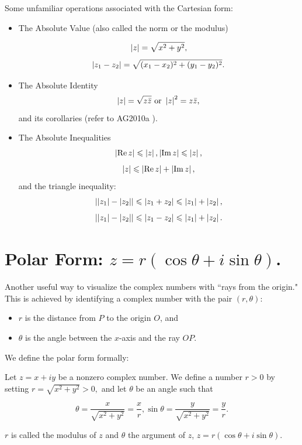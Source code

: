 \documentclass[11pt,reqno,oneside,a4paper]{article}
\begin{document}
Some unfamiliar operations associated with the Cartesian form: 
\begin{itemize}
	\item The Absolute Value (also called the norm or the modulus)
	
	$$\left\lvert z\right\rvert = \sqrt{x^2 + y^2},$$
	$$\left\lvert z_1 - z_2\right\rvert = \sqrt{(x_1-x_2)^2 + (y_1 - y_2)^2}.$$
	
	\item The Absolute Identity
	$$\left\lvert z\right\rvert = \sqrt{z \bar{z}} \text{ or } \left\lvert z\right\rvert^2 = z \bar{z},$$
	and its corollaries (refer to AG2010a \cite{AG2010a}). 
	
	\item The Absolute Inequalities
	$$\left\lvert\operatorname*{Re} z\right\rvert \leqslant \left\lvert z\right\rvert, \left\lvert\operatorname*{Im} z\right\rvert \leqslant \left\lvert z\right\rvert,$$
	$$\left\lvert z\right\rvert \leqslant \left\lvert\operatorname*{Re} z\right\rvert + \left\lvert\operatorname*{Im} z\right\rvert,$$
	and the triangle inequality: 
	$$\left\lvert\left\lvert z_1\right\rvert-\left\lvert z_2\right\rvert\right\rvert \leqslant \left\lvert z_1 + z_2\right\rvert \leqslant \left\lvert z_1\right\rvert + \left\lvert z_2\right\rvert,$$
	$$\left\lvert\left\lvert z_1\right\rvert-\left\lvert z_2\right\rvert\right\rvert \leqslant \left\lvert z_1 - z_2\right\rvert \leqslant \left\lvert z_1\right\rvert + \left\lvert z_2\right\rvert.$$ 
\end{itemize}

\section{Polar Form: $z = r(\cos\theta + i\sin\theta)$.}
Another useful way to visualize the complex numbers with ``rays from the origin." This is achieved by identifying a complex number with the pair $(r,\theta):$ 
\begin{itemize}
	\item $r$ is the distance from $P$ to the origin $O$, and 
	\item $\theta$ is the angle between the $x$-axis and the ray $OP$. 
\end{itemize}

We define the polar form formally: 

\begin{defn}
	Let $z=x+iy$ be a nonzero complex number. We define a number $r>0$ by setting $r = \sqrt{x^2 + y^2}>0,$ and let $\theta$ be an angle such that 
	
	$$\theta = \frac{x}{\sqrt{x^2 + y^2}} = \frac{x}{r}, \sin \theta = \frac{y}{\sqrt{x^2 + y^2}} = \frac{y}{r}.$$
	
	$r$ is called the modulus of $z$ and $\theta$ the argument of $z$, $z = r(\cos\theta + i\sin\theta).$
\end{defn}
\end{document}
